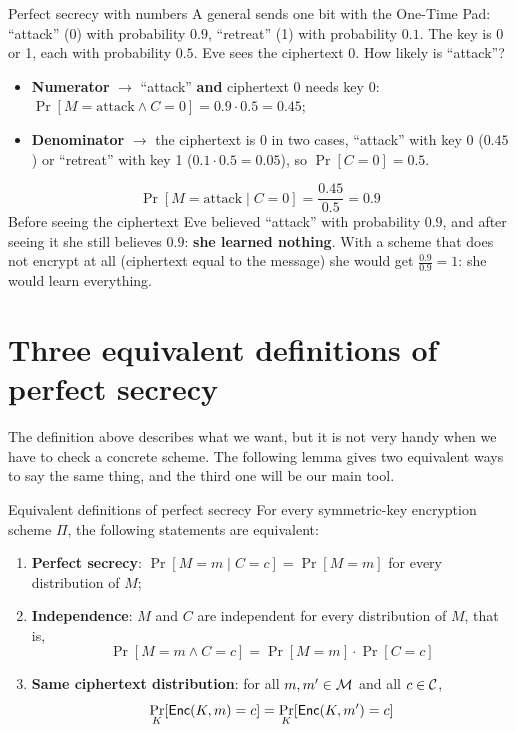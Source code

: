 \begin{framedex}{Perfect secrecy with numbers}
  A general sends one bit with the One-Time Pad: ``attack'' (0) with probability $0.9$, ``retreat'' (1) with probability $0.1$. The key is 0 or 1, each with probability $0.5$. Eve sees the ciphertext 0. How likely is ``attack''?
  \begin{itemize}
    \item \textbf{Numerator} $\to$ ``attack'' \textbf{and} ciphertext 0 needs key 0: $\Pr[M = \text{attack} \wedge C = 0] = 0.9 \cdot 0.5 = 0.45$;
    \item \textbf{Denominator} $\to$ the ciphertext is 0 in two cases, ``attack'' with key 0 ($0.45$) or ``retreat'' with key 1 ($0.1 \cdot 0.5 = 0.05$), so $\Pr[C = 0] = 0.5$.
  \end{itemize}
  \[
    \Pr[M = \text{attack} \mid C = 0] = \frac{0.45}{0.5} = 0.9
  \]
  Before seeing the ciphertext Eve believed ``attack'' with probability $0.9$, and after seeing it she still believes $0.9$: \textbf{she learned nothing}. With a scheme that does not encrypt at all (ciphertext equal to the message) she would get $\frac{0.9}{0.9} = 1$: she would learn everything.
\end{framedex}

\section{Three equivalent definitions of perfect secrecy}\label{sec:equivalent}

The definition above describes what we want, but it is not very handy when we have to check a concrete scheme. The following lemma gives two equivalent ways to say the same thing, and the third one will be our main tool.

\begin{framedlem}[label={lem:equivalent}]{Equivalent definitions of perfect secrecy}
  For every symmetric-key encryption scheme $\Pi$, the following statements are equivalent:
  \begin{enumerate}[label=(\roman*)]
    \item \textbf{Perfect secrecy}: $\Pr[M = m \mid C = c] = \Pr[M = m]$ for every distribution of $M$;
    \item \textbf{Independence}: $M$ and $C$ are independent for every distribution of $M$, that is,
    \[
      \Pr[M = m \wedge C = c] = \Pr[M = m] \cdot \Pr[C = c]
    \]
    \item \textbf{Same ciphertext distribution}: for all $m, m' \in \mathcal{M}$ and all $c \in \mathcal{C}$,
    \[
      \Pr_K[\mathsf{Enc}(K, m) = c] = \Pr_K[\mathsf{Enc}(K, m') = c]
    \]
  \end{enumerate}
\end{framedlem}

